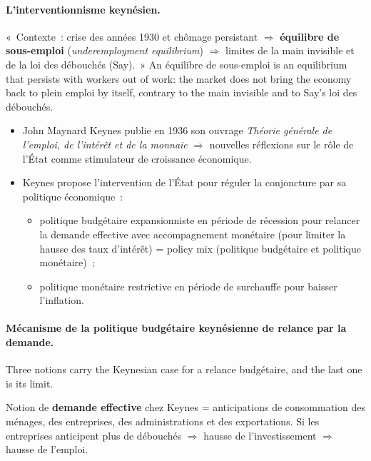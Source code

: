 \paragraph{L'interventionnisme keynésien.} «~Contexte~: crise des années 1930 et
chômage persistant $\Rightarrow$ \textbf{équilibre de sous-emploi}
(\textit{underemployment equilibrium}) $\Rightarrow$ limites de la main invisible
et de la loi des débouchés (Say).~» An équilibre de sous-emploi is an equilibrium
that persists with workers out of work: the market does not bring the economy
back to plein emploi by itself, contrary to the main invisible and to Say's loi
des débouchés.
\begin{itemize}
  \item John Maynard Keynes publie en 1936 son ouvrage \emph{Théorie générale de
    l'emploi, de l'intérêt et de la monnaie} $\Rightarrow$ nouvelles réflexions
    sur le rôle de l'État comme stimulateur de croissance économique.
  \item Keynes propose l'intervention de l'État pour réguler la conjoncture par
    sa politique économique~:
    \begin{itemize}
      \item politique budgétaire expansionniste en période de récession pour
        relancer la demande effective avec accompagnement monétaire (pour limiter
        la hausse des taux d'intérêt) = policy mix (politique budgétaire et
        politique monétaire)~;
      \item politique monétaire restrictive en période de surchauffe pour
        baisser l'inflation.
    \end{itemize}
\end{itemize}

\paragraph{Mécanisme de la politique budgétaire keynésienne de relance par la
demande.} Three notions carry the Keynesian case for a relance budgétaire, and
the last one is its limit.

\begin{definition}
  Notion de \textbf{demande effective} chez Keynes = anticipations de
  consommation des ménages, des entreprises, des administrations et des
  exportations. Si les entreprises anticipent plus de débouchés $\Rightarrow$
  hausse de l'investissement $\Rightarrow$ hausse de l'emploi.
\end{definition}

